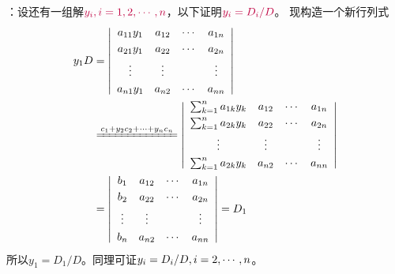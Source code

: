 \begin{frame}
  ：设还有一组解$\textcolor{purple}{y_i, i = 1, 2, \cdots, n}$，以下证明$\textcolor{purple}{y_i =D_i/D}$。
  现构造一个新行列式
  $$
  \begin{aligned}
    y_1D & =  \left|
      \begin{array}{cccc}
        a_{11}y_1 & a_{12}    &  \cd   &   a_{1n}      \\[0.1cm] 
        a_{21}y_1 & a_{22}    &  \cd   &   a_{2n}      \\[0.1cm] 
        \vd    &    \vd     &        &     \vd      \\[0.1cm] 
        a_{n1}y_1 & a_{n2}    &  \cd   &   a_{nn}      
      \end{array}
    \right| \\
    & \xlongequal{c_1 + y_2 c_2 + \cd + y_n c_n} 
    \left|
      \begin{array}{cccc}
        \sum_{k=1}^n a_{1k}y_k & a_{12}    &  \cd   &   a_{1n}      \\[0.1cm] 
        \sum_{k=1}^n a_{2k}y_k & a_{22}    &  \cd   &   a_{2n}      \\[0.1cm] 
        \vd    &    \vd     &        &     \vd      \\[0.1cm] 
        \sum_{k=1}^n a_{2k}y_k & a_{n2}    &  \cd   &   a_{nn}      
      \end{array}
    \right|  \\
    & = \left|
      \begin{array}{cccc}
        b_1 & a_{12}    &  \cd   &   a_{1n}      \\[0.1cm] 
        b_2 & a_{22}    &  \cd   &   a_{2n}      \\[0.1cm] 
        \vd    &    \vd     &        &     \vd      \\[0.1cm] 
        b_n & a_{n2}    &  \cd   &   a_{nn}      
      \end{array}
    \right|  = D_1
  \end{aligned}
  $$
  所以$y_1 = D_1/D$。同理可证$y_i=D_i/D, i = 2, \cdots, n$。
\end{frame}

